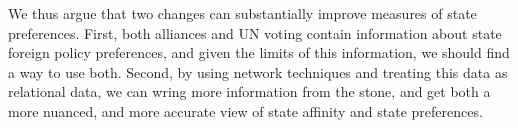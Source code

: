 We thus argue that two changes can substantially improve measures of state preferences. First, both alliances and UN voting contain information about state foreign policy preferences, and given the limits of this information, we should find a way to use both. Second, by using network techniques and treating this data as relational data, we can wring more information from the stone, and get both a more nuanced, and more accurate view of state affinity and state preferences.